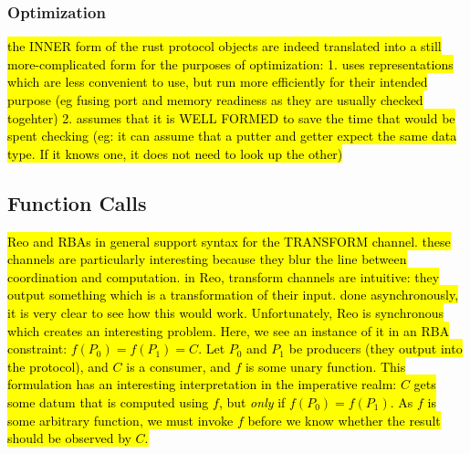 \subsubsection{Optimization}
\hl{the INNER form of the rust protocol objects are indeed translated into a still more-complicated form for the purposes of optimization:
1. uses representations which are less convenient to use, but run more efficiently for their intended purpose (eg fusing port and memory readiness as they are usually checked togehter)
2. assumes that it is WELL FORMED to save the time that would be spent checking (eg: it can assume that a putter and getter expect the same data type. If it knows one, it does not need to look up the other)
}


\subsection{Function Calls}
\hl{Reo and RBAs in general support syntax for the TRANSFORM channel. these channels are particularly interesting because they blur the line between coordination and computation. in Reo, transform channels are intuitive: they output something which is a transformation of their input. done asynchronously, it is very clear to see how this would work. Unfortunately, Reo is synchronous which creates an interesting problem. Here, we see an instance of it in an RBA constraint: $f(P_0)=f(P_1)=C$. Let $P_0$ and $P_1$ be producers (they output into the protocol), and $C$ is a consumer, and $f$ is some unary function. This formulation has an interesting interpretation in the imperative realm: $C$ gets some datum that is computed using $f$, but \textit{only} if $f(P_0)=f(P_1)$. As $f$ is some arbitrary function, we must invoke $f$ before we know whether the result should be observed by $C$. }